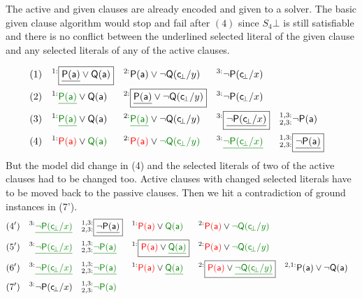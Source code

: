 \begin{example}[InstGen]The active and given clauses are already encoded and given to a \SAT solver.
	The basic given clause algorithm would stop and fail after $(4)$
	since $S_4\bot$ is still satisfiable and there is no conflict between the underlined selected literal of the given clause 
	and any selected literals of any of the active clauses.
	
	
	\begin{align*}
	(1)\quad^{1:}&\boxed{\underline{\mP(\ma)}\lor\mQ(\ma)} 
	& ^{2:}&\mP(\ma)\lor\lnot\mQ(\consbot/y) 
	& ^{3:}&\lnot\mP(\consbot/x)
	\\
	(2)\quad^{1:}&{\colHi\underline{\mP(\ma)}}\lor\mQ(\ma) 
	& ^{2:}&\boxed{\underline{\mP(\ma)}\lor\lnot\mQ(\consbot/y)} 
	& ^{3:}&\lnot\mP(\consbot/x) 
	\\
	(3)\quad^{1:}&{\colHi\underline{\mP(\ma)}}\lor\mQ(\ma) 
	& ^{2:}&{\colHi\underline{\mP(\ma)}}\lor\lnot\mQ(\consbot/y) 
	& ^{3:}&\boxed{\underline{\lnot\mP(\consbot/x)}} 
	& ^{1,3:}_{2,3:}&\lnot\mP(\ma)
	\\
	(4)\quad
	^{1:}&{\colLo\mP(\ma)}\lor\colHi\mQ(\ma) 
	& ^{2:}&{\colLo\mP(\ma)}\lor\colHi\lnot\mQ(\consbot/y) 
	& ^{3:}&{\colHi\underline{\lnot\mP(\consbot/x)}} 
	& ^{1,3:}_{2,3:}&\boxed{\underline{\lnot\mP(\ma)}}
	\end{align*}
	But the model did change in (4) and the selected literals of two of the active clauses had to be changed too.
	Active clauses with changed selected literals have to be moved back to the passive clauses.
	Then we hit a contradiction of ground instances in (7').
	\begin{align*}
	(4')\quad^{3:}&{\underline{\colHi\lnot\mP(\consbot/x)}} 
	& ^{1,3:}_{2,3:}&\boxed{\underline{\lnot\mP(\ma)}}
	& ^{1:}&{\colLo\mP(\ma)}\lor\colHi\mQ(\ma) 
	& ^{2:}&{\colLo\mP(\ma)}\lor\colHi\lnot\mQ(\consbot/y)
	\\
	(5')\quad^{3:}&{\underline{\colHi\lnot\mP(\consbot/x)}} 
	& ^{1,3:}_{2,3:}&\colHi\underline{\lnot\mP(\ma)}
	& ^{1:}&\boxed{{\colLo\mP(\ma)}\lor\colHi\underline{\mQ(\ma)}} 
	& ^{2:}&{\colLo\mP(\ma)}\lor\colHi\lnot\mQ(\consbot/y)
	\\
	(6')\quad^{3:}&{\colHi\underline{\lnot\mP(\consbot/x)}} 
	& ^{1,3:}_{2,3:}&\colHi\underline{\lnot\mP(\ma)}
	& ^{1:}&{\colLo\mP(\ma)}\lor\colHi\underline{\mQ(\ma)} 
	& ^{2:}&\boxed{{\colLo\mP(\ma)}\lor\colHi\underline{\lnot\mQ(\consbot/y)}}
	& ^{2,1:}&\mP(\ma)\lor\lnot\mQ(\ma)
	\\
	(7')\quad^{3:}&{\lnot\mP(\consbot/x)} 
	& ^{1,3:}_{2,3:}&\colHi\lnot\mP(\tikzmark{NP}\ma)

\end{align*}
\end{example}
